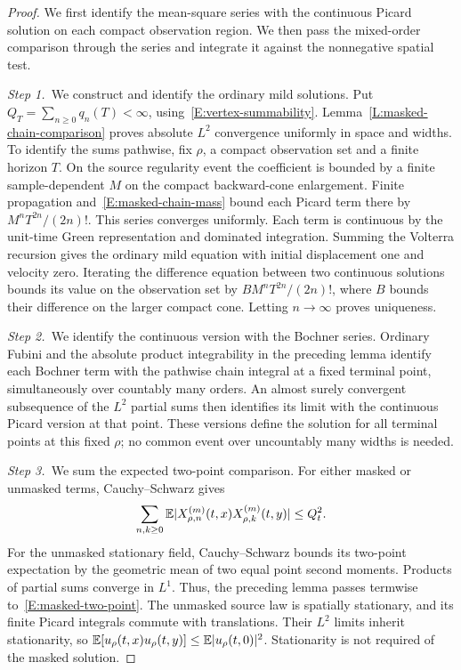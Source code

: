 \begin{proof}
  We first identify the mean-square series with the continuous Picard solution
  on each compact observation region. We then pass the mixed-order comparison
  through the series and integrate it against the nonnegative spatial test.

  \medskip
  \noindent\textit{Step 1.~}We construct and identify the ordinary mild
  solutions.
  Put $Q_T = \sum_{n\ge0}q_n(T) < \infty$, using~\eqref{E:vertex-summability}.
  Lemma~\ref{L:masked-chain-comparison} proves absolute $L^2$ convergence
  uniformly in space and widths. To identify the sums pathwise, fix $\rho$, a
  compact observation set and a finite horizon $T$. On the source regularity
  event the coefficient is bounded by a finite sample-dependent $M$ on the
  compact backward-cone enlargement. Finite propagation
  and~\eqref{E:masked-chain-mass} bound each Picard term there by
  $M^nT^{2n}/(2n)!$. This series converges uniformly. Each term is continuous by
  the unit-time Green representation and dominated integration. Summing the
  Volterra recursion gives the ordinary mild equation with initial displacement
  one and velocity zero. Iterating the difference equation between two
  continuous solutions bounds its value on the observation set by $B
  M^nT^{2n}/(2n)!$, where $B$ bounds their difference on the larger compact
  cone. Letting $n \to \infty$ proves uniqueness.


  \medskip
  \noindent\textit{Step 2.~}We identify the continuous version with the
  Bochner series.
  Ordinary Fubini and the absolute product integrability in the preceding lemma
  identify each Bochner term with the pathwise chain integral at a fixed
  terminal point, simultaneously over countably many orders. An almost surely
  convergent subsequence of the $L^2$ partial sums then identifies its limit
  with the continuous Picard version at that point. These versions define the
  solution for all terminal points at this fixed $\rho$; no common event over
  uncountably many widths is needed.

  \medskip
  \noindent\textit{Step 3.~}We sum the expected two-point comparison.
  For either masked or unmasked terms, Cauchy--Schwarz gives
  \[
    \sum_{n,k\ge0}\mathbb{E}|X_{\rho,n}^{(m)}(t,x)
    X_{\rho,k}^{(m)}(t,y)|\le Q_t^2.
  \]
  For the unmasked stationary field, Cauchy--Schwarz bounds its two-point
  expectation by the geometric mean of two equal point second moments.
  Products of partial sums converge in $L^1$. Thus, the preceding lemma passes
  termwise to~\eqref{E:masked-two-point}. The unmasked source law is spatially
  stationary, and its finite Picard integrals commute with translations. Their
  $L^2$ limits inherit stationarity, so $\mathbb{E}[u_\rho(t,x)u_\rho(t,y)] \le
  \mathbb{E}|u_\rho(t,0)|^2$. Stationarity is not required of the masked solution.



\end{proof}
